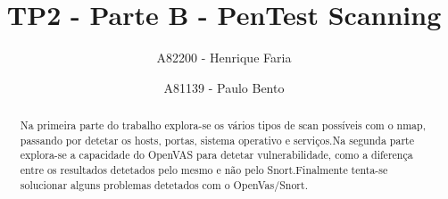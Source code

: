 

\title{TP2 - Parte B - PenTest Scanning}

\author{A82200 - Henrique Faria \and A81139 - Paulo Bento}




\maketitle

\begin{abstract}

Na primeira parte do trabalho explora-se os vários tipos de scan possíveis com o nmap, passando por detetar os hosts, portas, sistema operativo e serviços.Na segunda parte explora-se a capacidade do OpenVAS para detetar vulnerabilidade, como a diferença entre os resultados detetados pelo mesmo e não pelo Snort.Finalmente tenta-se solucionar alguns problemas detetados com o OpenVas/Snort.

\end{abstract}
\newpage

